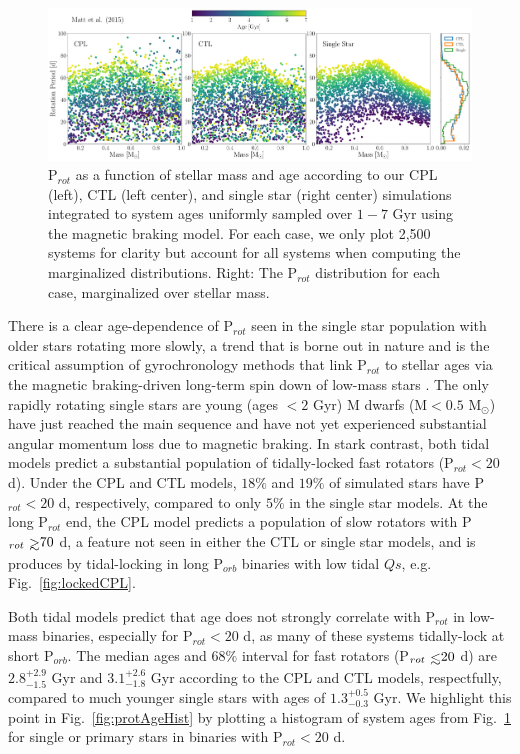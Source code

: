 \documentclass[twocolumn]{aastex61}
\def\gsim{~\rlap{$>$}{\lower 1.0ex\hbox{$\sim$}}}
\def\lsim{~\rlap{$<$}{\lower 1.0ex\hbox{$\sim$}}}
\begin{document}
\begin{figure}[t]
	\includegraphics[width=\textwidth]{../Plots/protDist.pdf}
   \caption{P$_{rot}$ as a function of stellar mass and age according to our CPL (left), CTL (left center), and single star (right center) simulations integrated to system ages uniformly sampled over $1-7$ Gyr using the \citet{Matt2015} magnetic braking model. For each case, we only plot 2,500 systems for clarity but account for all systems when computing the marginalized distributions. Right: The P$_{rot}$ distribution for each case, marginalized over stellar mass.}%
    \label{fig:protDist}%
\end{figure}

There is a clear age-dependence of P$_{rot}$ seen in the single star population with older stars rotating more slowly, a trend that is borne out in nature and is the critical assumption of gyrochronology methods that link P$_{rot}$ to stellar ages via the magnetic braking-driven long-term spin down of low-mass stars \citep[e.g.][]{Skumanich1972,Barnes2003,Barnes2007,Mamajek2008,Barnes2010,Meibom2015}. The only rapidly rotating single stars are young (ages $< 2$ Gyr) M dwarfs (M$ < 0.5$ M$_{\odot}$) have just reached the main sequence and have not yet experienced substantial angular momentum loss due to magnetic braking.  In stark contrast, both tidal models predict a substantial population of tidally-locked fast rotators (P$_{rot} < 20$ d). Under the CPL and CTL models, $18\%$ and $19\%$ of simulated stars have P$_{rot} < 20 $ d, respectively, compared to only $5\%$ in the single star models.  At the long P$_{rot}$ end, the CPL model predicts a population of slow rotators with P$_{rot} \gsim 70$ d, a feature not seen in either the CTL or single star models, and is produces by tidal-locking in long P$_{orb}$ binaries with low tidal $Qs$, e.g. Fig.~\ref{fig:lockedCPL}.

Both tidal models predict that age does not strongly correlate with P$_{rot}$ in low-mass binaries, especially for P$_{rot} < 20 $ d, as many of these systems tidally-lock at short P$_{orb}$. The median ages and $68\%$ interval for fast rotators (P$_{rot} \lsim 20$ d) are $2.8^{+2.9}_{-1.5}$ Gyr and $3.1^{+2.6}_{-1.8}$ Gyr according to the CPL and CTL models, respectfully, compared to much younger single stars with ages of $1.3^{+0.5}_{-0.3}$ Gyr. We highlight this point in Fig.~\ref{fig:protAgeHist} by plotting a histogram of system ages from Fig.~\ref{fig:protDist} for single or primary stars in binaries with P$_{rot} < 20$ d.  
\end{document}

